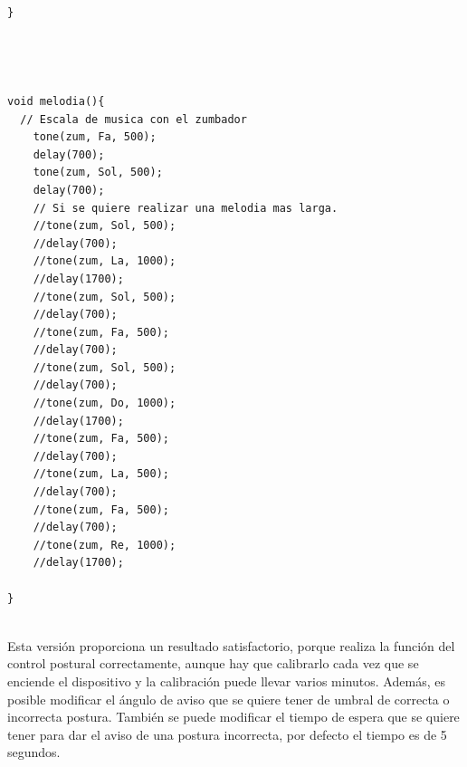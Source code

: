 \begin{lstlisting}
}




void melodia(){
  // Escala de musica con el zumbador
    tone(zum, Fa, 500);
    delay(700);
    tone(zum, Sol, 500);
    delay(700);
    // Si se quiere realizar una melodia mas larga.
    //tone(zum, Sol, 500);
    //delay(700);
    //tone(zum, La, 1000);
    //delay(1700);
    //tone(zum, Sol, 500);
    //delay(700);
    //tone(zum, Fa, 500);
    //delay(700);
    //tone(zum, Sol, 500);
    //delay(700);
    //tone(zum, Do, 1000);
    //delay(1700);
    //tone(zum, Fa, 500);
    //delay(700);
    //tone(zum, La, 500);
    //delay(700);
    //tone(zum, Fa, 500);
    //delay(700);
    //tone(zum, Re, 1000);
    //delay(1700);
    
}


\end{lstlisting}

Esta versión proporciona un resultado satisfactorio, porque realiza la función del control postural correctamente, aunque hay que calibrarlo cada vez que se enciende el dispositivo y la calibración puede llevar varios minutos. Además, es posible modificar el ángulo de aviso que se quiere tener de umbral de correcta o incorrecta postura. También se puede modificar el tiempo de espera que se quiere tener para dar el aviso de una postura incorrecta, por defecto el tiempo es de 5 segundos.

